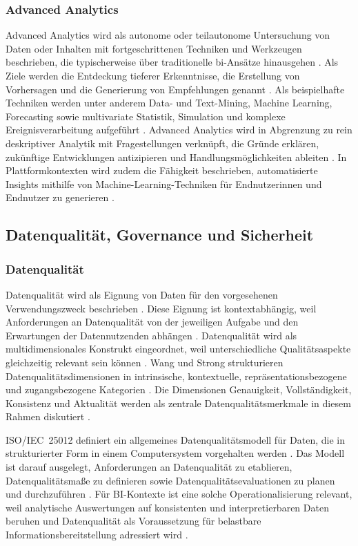 \subsubsection{Advanced Analytics}
Advanced Analytics wird als autonome oder teilautonome Untersuchung von Daten oder Inhalten mit fortgeschrittenen Techniken und Werkzeugen beschrieben, die typischerweise über traditionelle \gls{bi}-Ansätze hinausgehen \cite{GartnerAdvancedAnalytics}. Als Ziele werden die Entdeckung tieferer Erkenntnisse, die Erstellung von Vorhersagen und die Generierung von Empfehlungen genannt \cite{GartnerAdvancedAnalytics}. Als beispielhafte Techniken werden unter anderem Data- und Text-Mining, Machine Learning, Forecasting sowie multivariate Statistik, Simulation und komplexe Ereignisverarbeitung aufgeführt \cite{GartnerAdvancedAnalytics}. Advanced Analytics wird in Abgrenzung zu rein deskriptiver Analytik mit Fragestellungen verknüpft, die Gründe erklären, zukünftige Entwicklungen antizipieren und Handlungsmöglichkeiten ableiten \cite{GartnerPressReleaseAdvancedAnalytics2014}. In Plattformkontexten wird zudem die Fähigkeit beschrieben, automatisierte Insights mithilfe von Machine-Learning-Techniken für Endnutzerinnen und Endnutzer zu generieren \cite{GartnerABIPlatformReq}. 


\subsection{Datenqualität, Governance und Sicherheit}

\subsubsection{Datenqualität}
Datenqualität wird als Eignung von Daten für den vorgesehenen Verwendungszweck beschrieben \cite{WangStrong1996}. 
Diese Eignung ist kontextabhängig, weil Anforderungen an Datenqualität von der jeweiligen Aufgabe und den Erwartungen der Datennutzenden abhängen \cite{WangStrong1996}. Datenqualität wird als multidimensionales Konstrukt eingeordnet, weil unterschiedliche Qualitätsaspekte gleichzeitig relevant sein können \cite{WangStrong1996}. Wang und Strong strukturieren Datenqualitätsdimensionen in intrinsische, kontextuelle, repräsentationsbezogene und zugangsbezogene Kategorien \cite{WangStrong1996}. Die Dimensionen Genauigkeit, Vollständigkeit, Konsistenz und Aktualität werden als zentrale Datenqualitätsmerkmale in diesem Rahmen diskutiert \cite{WangStrong1996}. 

ISO/IEC~25012 definiert ein allgemeines Datenqualitätsmodell für Daten, die in strukturierter Form in einem Computersystem vorgehalten werden \cite{ISO25012}. Das Modell ist darauf ausgelegt, Anforderungen an Datenqualität zu etablieren, Datenqualitätsmaße zu definieren sowie Datenqualitätsevaluationen zu planen und durchzuführen \cite{ISO25012}. Für BI-Kontexte ist eine solche Operationalisierung relevant, weil analytische Auswertungen auf konsistenten und interpretierbaren Daten beruhen und Datenqualität als Voraussetzung für belastbare Informationsbereitstellung adressiert wird \cite{BaarsKemper2021}. 

